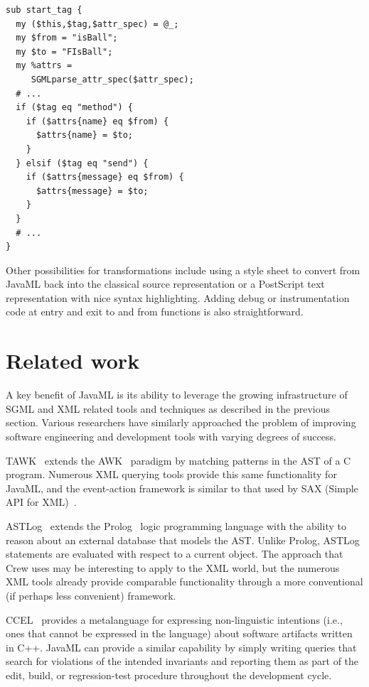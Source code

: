 \documentclass{article}
\begin{document}
\begin{verbatim}
sub start_tag { 
  my ($this,$tag,$attr_spec) = @_;
  my $from = "isBall";
  my $to = "FIsBall";
  my %attrs = 
     SGMLparse_attr_spec($attr_spec);
  # ...
  if ($tag eq "method") {
    if ($attrs{name} eq $from) {
      $attrs{name} = $to;
    }
  } elsif ($tag eq "send") {
    if ($attrs{message} eq $from) {
      $attrs{message} = $to;
    }
  }
  # ...
}
\end{verbatim}

Other possibilities for transformations include using a style sheet to
convert from JavaML back into the classical source representation or a
PostScript text representation with nice syntax highlighting.  Adding
debug or instrumentation code at entry and exit to and from functions is
also straightforward.

\section{Related work}
\label{sec-related}

A key benefit of JavaML is its ability to leverage the growing
infrastructure of SGML and XML related tools and techniques as described
in the previous section.  Various researchers have similarly approached
the problem of improving software engineering and development tools with
varying degrees of success.

TAWK~\cite{TAWK} extends the AWK~\cite{AwkSed} paradigm by matching
patterns in the AST of a C program.  Numerous XML querying tools provide
this same functionality for JavaML, and the event-action framework is
similar to that used by SAX (Simple API for XML)~\cite{SAX}.

ASTLog~\cite{ASTLog} extends the Prolog~\cite{Prolog} logic programming
language with the ability to reason about an external database that
models the AST.  Unlike Prolog, ASTLog statements are evaluated with
respect to a current object.  The approach that Crew uses may be
interesting to apply to the XML world, but the numerous XML tools
already provide comparable functionality through a more conventional (if
perhaps less convenient) framework.

CCEL~\cite{CCEL92} provides a metalanguage for expressing non-linguistic
intentions (i.e., ones that cannot be expressed in the language) about
software artifacts written in C++.  JavaML can provide a similar
capability by simply writing queries that search for violations of the
intended invariants and reporting them as part of the edit, build, or
regression-test procedure throughout the development cycle.
\end{document}
